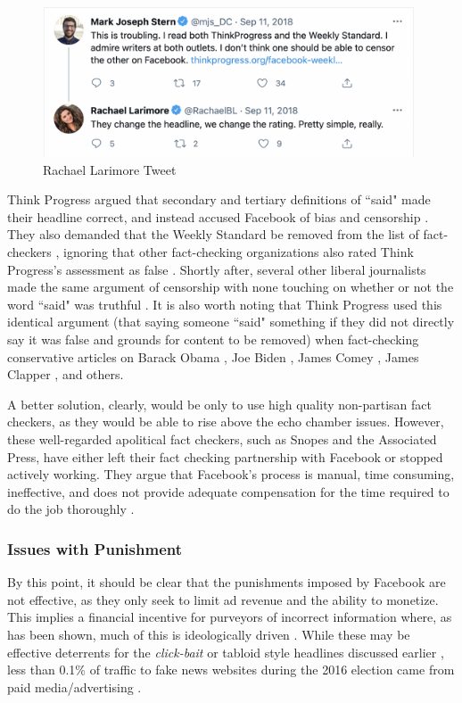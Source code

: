 \documentclass[preprint,review,12pt]{elsarticle}
\begin{document}
 \begin{figure}[h]
    \centering
    \includegraphics[width=11cm]{Larimore Tweet.png}
    \caption{Rachael Larimore Tweet \cite{larimore2018tweet}}
    \label{fig:Rachael Larimore Tweet, Sep 11, 2018}
\end{figure} 
Think Progress argued that secondary and tertiary definitions of ``said" made their headline correct, and instead accused Facebook of bias and censorship \cite{legum2018tweet}. They also demanded that the Weekly Standard be removed from the list of fact-checkers \cite{Millhiser2018Facebook}, ignoring that other fact-checking organizations also rated Think Progress's assessment as false \cite{gore2018kavanaugh,tobias2018kavanaugh}.
Shortly after, several other liberal journalists made the same argument of censorship with none touching on whether or not the word ``said" was truthful \cite{froomkin2018tweet,grim2018tweet,beutler2018tweet}. It is also worth noting that Think Progress used this identical argument (that saying someone ``said" something if they did not directly say it was false and grounds for content to be removed) when fact-checking conservative articles on Barack Obama \cite{legum2008context}, Joe Biden \cite{volsky2016biden}, James Comey \cite{israel2018rnc}, James Clapper \cite{lerner2015cruz}, and others. 
 
A better solution, clearly, would be only to use high quality non-partisan fact checkers, as they would be able to rise above the echo chamber issues. However, these well-regarded apolitical fact checkers, such as Snopes and the Associated Press, have either left their fact checking partnership with Facebook or stopped actively working. They argue that Facebook's process is manual, time consuming, ineffective, and does not provide adequate compensation for the time required to do the job thoroughly \cite{green2019message,coldeway2019update}. 

\subsubsection{Issues with Punishment}
\label{Issues with Punishment Section}
By this point, it should be clear that the punishments imposed by Facebook are not effective, as they only seek to limit ad revenue and the ability to monetize. This implies a financial incentive for purveyors of incorrect information where, as has been shown, much of this is ideologically driven \cite{allcott2017social}. While these may be effective deterrents for the \textit{click-bait} or tabloid style headlines discussed earlier  \cite{chen2015misleading}, less than 0.1\% of traffic to fake news websites during the 2016 election came from paid media/advertising \cite{albright2016election2016}. 
\end{document}

